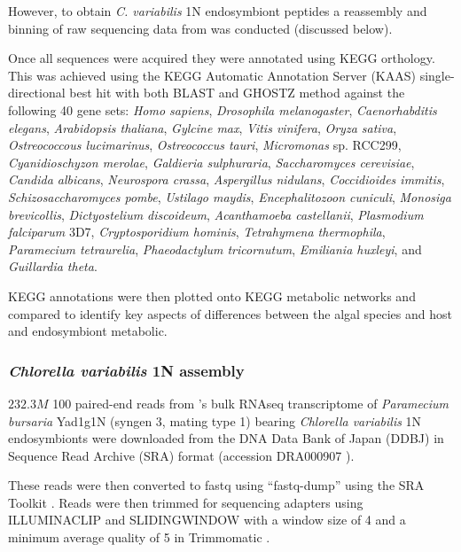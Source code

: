 However, to obtain \textit{C. variabilis} 1N endosymbiont peptides 
a reassembly and binning of raw sequencing data from \citep{Kodama2014}
was conducted (discussed below). 

Once all sequences were acquired they were annotated using KEGG
orthology.  This was achieved 
using the KEGG Automatic Annotation Server (KAAS) \citep{Moriya2007a}
single-directional best hit with both BLAST and GHOSTZ \citep{Suzuki2014,Suzuki2015} 
method against the following 40 gene sets: \textit{Homo sapiens}, 
\textit{Drosophila melanogaster}, \textit{Caenorhabditis elegans},
\textit{Arabidopsis thaliana}, \textit{Gylcine max},
\textit{Vitis vinifera}, \textit{Oryza sativa}, 
\textit{Ostreococcous lucimarinus}, \textit{Ostreococcus tauri},
\textit{Micromonas} sp. RCC299, \textit{Cyanidioschyzon merolae},
\textit{Galdieria sulphuraria}, \textit{Saccharomyces cerevisiae},
\textit{Candida albicans}, \textit{Neurospora crassa}, \textit{Aspergillus nidulans},
\textit{Coccidioides immitis}, \textit{Schizosaccharomyces pombe},
\textit{Ustilago maydis}, \textit{Encephalitozoon cuniculi},
\textit{Monosiga brevicollis}, \textit{Dictyostelium discoideum}, 
\textit{Acanthamoeba castellanii}, \textit{Plasmodium falciparum} 3D7, 
\textit{Cryptosporidium hominis}, \textit{Tetrahymena thermophila},
\textit{Paramecium tetraurelia}, \textit{Phaeodactylum tricornutum},
\textit{Emiliania huxleyi}, and \textit{Guillardia theta}.

KEGG annotations were then plotted onto KEGG metabolic networks and compared 
to identify key aspects of differences between the algal species and
host and endosymbiont metabolic.

\subsubsection{\textit{Chlorella variabilis} 1N assembly}
\(232.3M\) \SI{100}{\bp} paired-end reads from \citep{Kodama2014}'s 
bulk RNAseq transcriptome of \textit{Paramecium bursaria} Yad1g1N (syngen
3, mating type 1) bearing \textit{Chlorella variabilis} 1N endosymbionts
were downloaded from the DNA Data Bank of Japan (DDBJ) \citep{Tateno2002,Kaminuma2011}
in Sequence Read Archive (SRA) format \citep{Leinonen2011,KodamaNRA2012b} (accession DRA000907 \citet{Kodama2014}).

These reads were then converted to fastq using ``fastq-dump'' using the SRA Toolkit
\citep{NationalCenterforBiotechnologyInformation2011}.  Reads were then trimmed
for sequencing adapters using ILLUMINACLIP and SLIDINGWINDOW with a window size
of 4 and a minimum average quality of 5 in Trimmomatic \citep{Bolger2014a}.

